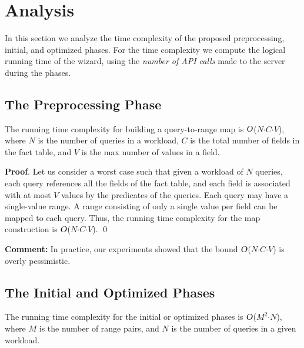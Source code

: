 \documentclass[runningheads]{comsis2}
\def\BigO{\mbox{\sl O}}
\begin{document}
\vspace{-.1in}

\section{Analysis}
\label{sec:analysis}

In this section we analyze the time complexity of 
the proposed preprocessing, initial, and optimized phases.
For the time complexity we compute the logical running time of the wizard, using the {\em number of API calls} 
made to the server during the phases. 


\subsection{The Preprocessing Phase}

\begin{lemma}
\label{lemma:pre_phase}  
The running time complexity for building a query-to-range map is 
$\BigO$($N${$\cdot$}$C${$\cdot$}$V$), where $N$ is the number of queries 
in a workload, $C$ is the total number of fields in the fact table, 
and $V$ is the max number of values in a field. 
\end{lemma}

{\bf Proof}. Let us consider a worst case such that given a workload of 
$N$ queries, each query references all the fields of the fact table, and 
each field is associated with at most $V$ values by the predicates of the queries. 
Each query may have a single-value range. 
A range consisting of only a single value per field can be mapped to each query. 
Thus, the running time complexity for the map construction 
is $\BigO$($N${$\cdot$}$C${$\cdot$}$V$). \qed

{\bf Comment:} In practice, our experiments showed that the bound 
$\BigO$($N${$\cdot$}$C${$\cdot$}$V$) is overly pessimistic. 

\subsection{The Initial and Optimized Phases}

\begin{lemma}
\label{lemma:init_phase}  
The running time complexity for the initial or optimized phases is 
$\BigO$($M^{2}${$\cdot$}$N$), 
where $M$ is the number of range pairs, and $N$ is the number of queries in 
a given workload. 
\end{lemma}
\end{document}
